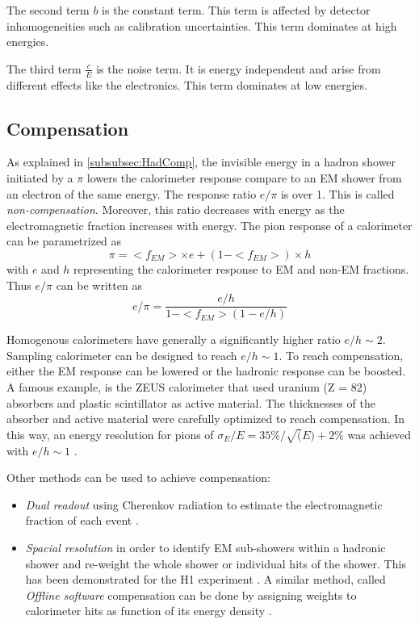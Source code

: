 The second term $b$ is the constant term. This term is affected by detector inhomogeneities such as calibration uncertainties. This term dominates at high energies.

The third term $\frac{c}{E}$ is the noise term. It is energy independent and arise from different effects like the electronics. This term dominates at low energies.

\subsection{Compensation}
\label{subsec:Compensation}

As explained in \ref{subsubsec:HadComp}, the invisible energy in a hadron shower initiated by a $\pi$ lowers the calorimeter response compare to an EM shower from an electron of the same energy. The response ratio $e/\pi$ is over 1. This is called \textit{non-compensation}. Moreover, this ratio decreases with energy as the electromagnetic fraction increases with energy. The pion response of a calorimeter can be parametrized as
\begin{equation}
  \pi = <f_{EM}> \times e + (1 - <f_{EM}>) \times h
\end{equation}
with $e$ and $h$ representing the calorimeter response to EM and non-EM fractions. Thus $e/\pi$ can be written as
\begin{equation}
  e/\pi = \frac{e/h}{1 - <f_{EM}>\left(1 - e/h\right)}
\end{equation}

Homogenous calorimeters have generally a significantly higher ratio $e/h \sim 2$. Sampling calorimeter can be designed to reach $e/h \sim 1$. To reach compensation, either the EM response can be lowered or the hadronic response can be boosted. A famous example, is the ZEUS calorimeter that used uranium (Z = 82) absorbers and plastic scintillator as active material. The thicknesses of the absorber and active material were carefully optimized to reach compensation. In this way, an energy resolution for pions of $\sigma_E/E = 35\%/\sqrt(E) + 2\%$ was achieved with $e/h \sim 1$ \cite{BERNSTEIN199323}.

Other methods can be used to achieve compensation:
\begin{itemize}
  \item \textit{Dual readout} using Cherenkov radiation to estimate the electromagnetic fraction of each event \cite{Akchurin:2013yaa}.
  \item \textit{Spacial resolution} in order to identify EM sub-showers within a hadronic shower and re-weight the whole shower or individual hits of the shower. This has been demonstrated for the H1 experiment \cite{Schacht:1990zw}. A similar method, called \textit{Offline software} compensation can be done by assigning weights to calorimeter hits as function of its energy density \cite{SoftCompNew2012}.
\end{itemize}

